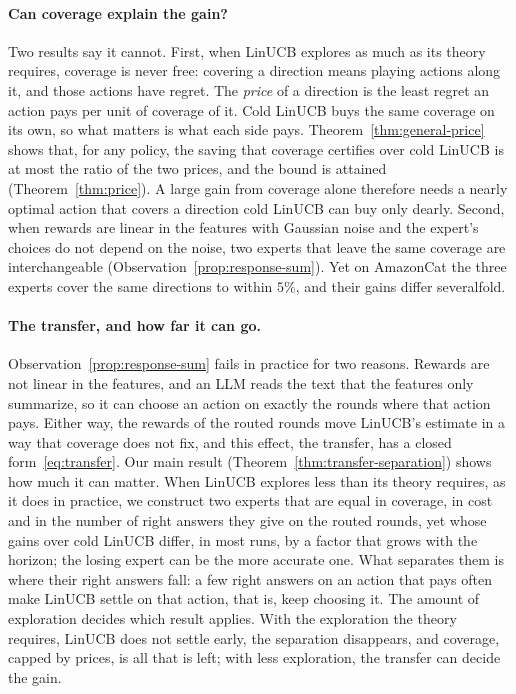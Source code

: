\documentclass[anon]{alt2027} %
\begin{document}
\paragraph{Can coverage explain the gain?}
Two results say it cannot. First, when LinUCB explores as much as its theory
requires, coverage is never free: covering a direction means playing actions
along it, and those actions have regret. The \emph{price} of a direction is
the least regret an action pays per unit of coverage of it. Cold LinUCB buys
the same coverage on its own, so what matters is what each side pays.
Theorem~\ref{thm:general-price} shows that, for any policy, the saving that
coverage certifies over cold LinUCB is at most the ratio of the two prices,
and the bound is attained (Theorem~\ref{thm:price}). A large gain from
coverage alone therefore needs a nearly optimal action that covers a
direction cold LinUCB can buy only dearly. Second, when rewards are linear in
the features with Gaussian noise and the expert's choices do not depend on
the noise, two experts that leave the same coverage are interchangeable
(Observation~\ref{prop:response-sum}). Yet on AmazonCat the three experts
cover the same directions to within $5\%$, and their gains differ
severalfold.

\paragraph{The transfer, and how far it can go.}
Observation~\ref{prop:response-sum} fails in practice for two reasons.
Rewards are not linear in the features, and an LLM reads the text that the
features only summarize, so it can choose an action on exactly the rounds
where that action pays. Either way, the rewards of the routed rounds move
LinUCB's estimate in a way that coverage does not fix, and this effect, the
transfer, has a closed form~\eqref{eq:transfer}. Our main result
(Theorem~\ref{thm:transfer-separation}) shows how much it can matter. When
LinUCB explores less than its theory requires, as it does in practice, we
construct two experts that are equal in coverage, in cost and in the number
of right answers they give on the routed rounds, yet whose gains over cold
LinUCB differ, in most runs, by a factor that grows with the horizon; the
losing expert can be the more accurate one. What separates them is where
their right answers fall: a few right answers on an action that pays often
make LinUCB settle on that action, that is, keep choosing it. The amount of
exploration decides which result applies. With the exploration the theory
requires, LinUCB does not settle early, the separation disappears, and
coverage, capped by prices, is all that is left; with less exploration, the
transfer can decide the gain.
\end{document}
